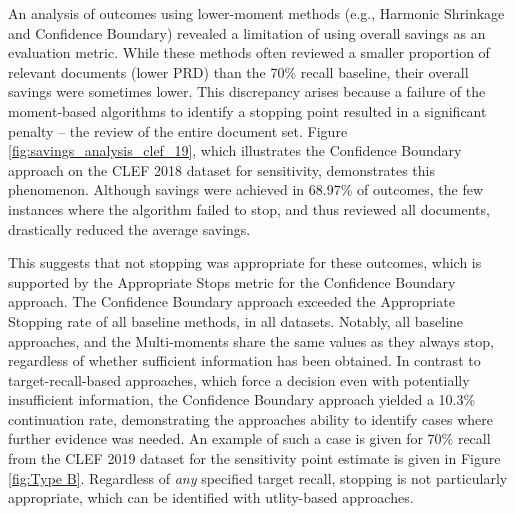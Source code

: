 \documentclass[sigconf,natbib=true,anonymous=true]{acmart}
\begin{document}





An analysis of outcomes using lower-moment methods (e.g., Harmonic Shrinkage and Confidence Boundary) revealed a limitation of using overall savings as an evaluation metric. While these methods often reviewed a smaller proportion of relevant documents (lower PRD) than the 70\% recall baseline, their overall savings were sometimes lower. This discrepancy arises because a failure of the moment-based algorithms to identify a stopping point resulted in a significant penalty – the review of the entire document set. Figure \ref{fig:savings_analysis_clef_19}, which illustrates the Confidence Boundary approach on the CLEF 2018 dataset for sensitivity, demonstrates this phenomenon. Although savings were achieved in 68.97\% of outcomes, the few instances where the algorithm failed to stop, and thus reviewed all documents, drastically reduced the average savings. 

This suggests that not stopping was appropriate for these outcomes, which is supported by the Appropriate Stops metric for the Confidence Boundary approach. The Confidence Boundary approach exceeded the Appropriate Stopping rate of all baseline methods, in all datasets. Notably, all baseline approaches, and the Multi-moments share the same values as they always stop, regardless of whether sufficient information has been obtained. In contrast to target-recall-based approaches, which force a decision even with potentially insufficient information, the Confidence Boundary approach yielded a 10.3\% continuation rate, demonstrating the approaches ability to identify cases where further evidence was needed. An example of such a case is given for 70\% recall from the CLEF 2019 dataset for the sensitivity point estimate is given in Figure \ref{fig:Type B}. Regardless of \emph{any} specified target recall, stopping is not particularly appropriate, which can be identified with utlity-based approaches.
\end{document}
